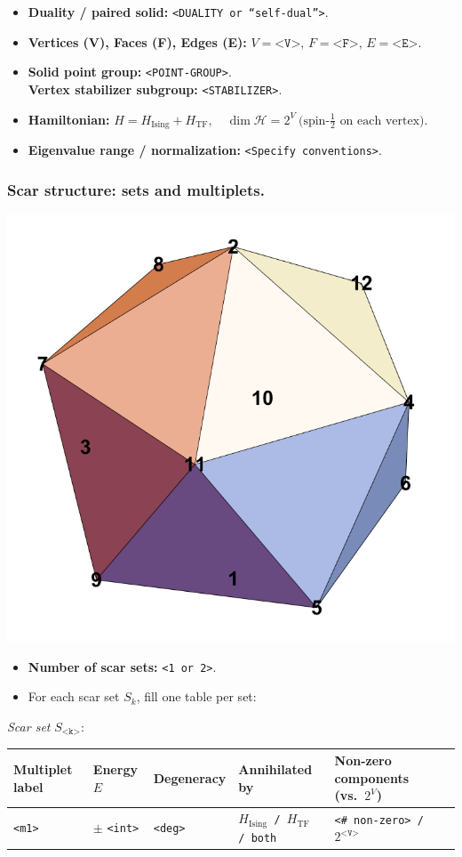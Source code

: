 \documentclass[11pt,a4paper]{article}
\newcommand{\Hising}{H_{\mathrm{Ising}}}
\newcommand{\Htf}{H_{\mathrm{TF}}}
\newcommand{\Htot}{H=\Hising+\Htf}
\begin{document}
\begin{itemize}[leftmargin=1.5em]
  \item \textbf{Duality / paired solid:} \texttt{<DUALITY or “self-dual”>}.
  \item \textbf{Vertices (V), Faces (F), Edges (E):} $V=\texttt{<V>}$,\; $F=\texttt{<F>}$,\; $E=\texttt{<E>}$.
  \item \textbf{Solid point group:} \texttt{<POINT-GROUP>}.\\
        \textbf{Vertex stabilizer subgroup:} \texttt{<STABILIZER>}.
  \item \textbf{Hamiltonian:} \(
        \Htot,\quad
        \dim\mathcal{H} = 2^{V}\ \text{(spin-$\tfrac12$ on each vertex).}
        \)
  \item \textbf{Eigenvalue range / normalization:} \texttt{<Specify conventions>}.
\end{itemize}

\subsubsection*{Scar structure: sets and multiplets.}
\begin{center}
  \includegraphics[width=.6\linewidth]{icosahedron}
\end{center}

\begin{itemize}[leftmargin=1.5em]
  \item \textbf{Number of scar sets:} \texttt{<1 or 2>}. 
  \item For each scar set $S_k$, fill one table per set:
\end{itemize}

\noindent\textit{Scar set} $S_{\texttt{<k>}}$:  
\begin{center}
\begin{tabular}{L{3.5cm} C{2.2cm} C{2.2cm} C{2.2cm} C{3.0cm} C{3.2cm}}
\toprule
\textbf{Multiplet label} & \textbf{Energy $E$} & \textbf{Degeneracy} & \textbf{Annihilated by} & \textbf{Non-zero components (vs.\ $2^{V}$)} \\
\midrule
\texttt{<m1>} & $\pm$ \texttt{<int>} & \texttt{<deg>} & \texttt{$\Hising$ / $\Htf$ / both} & \texttt{<\# non-zero> / $2^{\texttt{<V>}}$} \\
\bottomrule
\end{tabular}
\end{center}
\end{document}
